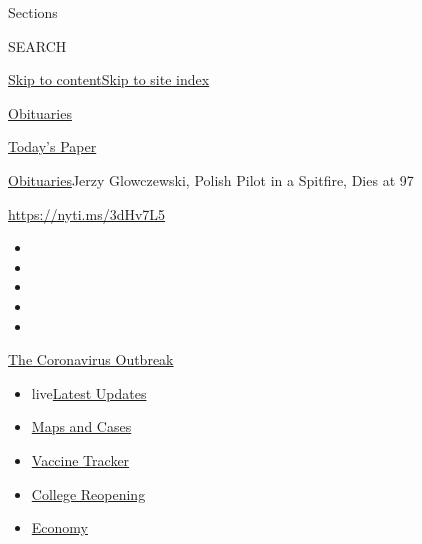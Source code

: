 Sections

SEARCH

\protect\hyperlink{site-content}{Skip to
content}\protect\hyperlink{site-index}{Skip to site index}

\href{https://www.nytimes3xbfgragh.onion/section/obituaries}{Obituaries}

\href{https://myaccount.nytimes3xbfgragh.onion/auth/login?response_type=cookie\&client_id=vi}{}

\href{https://www.nytimes3xbfgragh.onion/section/todayspaper}{Today's
Paper}

\href{/section/obituaries}{Obituaries}\textbar{}Jerzy Glowczewski,
Polish Pilot in a Spitfire, Dies at 97

\url{https://nyti.ms/3dHv7L5}

\begin{itemize}
\item
\item
\item
\item
\item
\end{itemize}

\href{https://www.nytimes3xbfgragh.onion/news-event/coronavirus?action=click\&pgtype=Article\&state=default\&region=TOP_BANNER\&context=storylines_menu}{The
Coronavirus Outbreak}

\begin{itemize}
\tightlist
\item
  live\href{https://www.nytimes3xbfgragh.onion/2020/08/04/world/coronavirus-covid-19.html?action=click\&pgtype=Article\&state=default\&region=TOP_BANNER\&context=storylines_menu}{Latest
  Updates}
\item
  \href{https://www.nytimes3xbfgragh.onion/interactive/2020/us/coronavirus-us-cases.html?action=click\&pgtype=Article\&state=default\&region=TOP_BANNER\&context=storylines_menu}{Maps
  and Cases}
\item
  \href{https://www.nytimes3xbfgragh.onion/interactive/2020/science/coronavirus-vaccine-tracker.html?action=click\&pgtype=Article\&state=default\&region=TOP_BANNER\&context=storylines_menu}{Vaccine
  Tracker}
\item
  \href{https://www.nytimes3xbfgragh.onion/2020/08/02/us/covid-college-reopening.html?action=click\&pgtype=Article\&state=default\&region=TOP_BANNER\&context=storylines_menu}{College
  Reopening}
\item
  \href{https://www.nytimes3xbfgragh.onion/live/2020/08/03/business/stock-market-today-coronavirus?action=click\&pgtype=Article\&state=default\&region=TOP_BANNER\&context=storylines_menu}{Economy}
\end{itemize}

